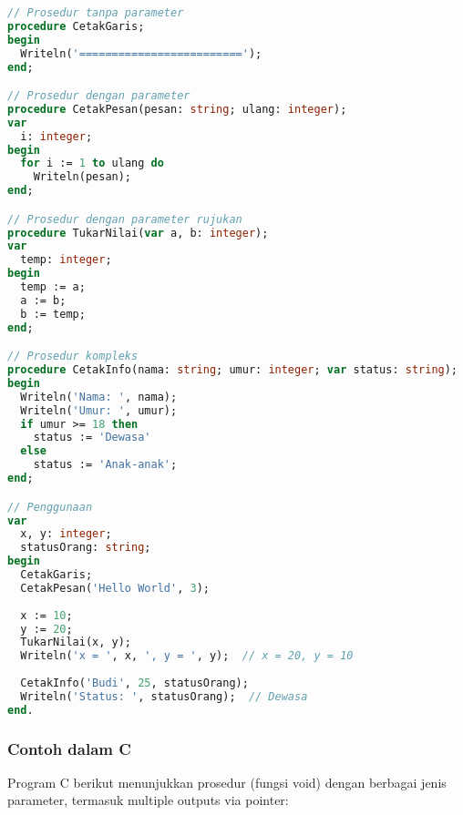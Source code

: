 \documentclass[../main.tex]{subfiles}
\begin{document}
\begin{lstlisting}[language=Pascal, caption={Deklarasi dan definisi prosedur (Pascal)}]
// Prosedur tanpa parameter
procedure CetakGaris;
begin
  Writeln('=========================');
end;

// Prosedur dengan parameter
procedure CetakPesan(pesan: string; ulang: integer);
var
  i: integer;
begin
  for i := 1 to ulang do
    Writeln(pesan);
end;

// Prosedur dengan parameter rujukan
procedure TukarNilai(var a, b: integer);
var
  temp: integer;
begin
  temp := a;
  a := b;
  b := temp;
end;

// Prosedur kompleks
procedure CetakInfo(nama: string; umur: integer; var status: string);
begin
  Writeln('Nama: ', nama);
  Writeln('Umur: ', umur);
  if umur >= 18 then
    status := 'Dewasa'
  else
    status := 'Anak-anak';
end;

// Penggunaan
var
  x, y: integer;
  statusOrang: string;
begin
  CetakGaris;
  CetakPesan('Hello World', 3);
  
  x := 10;
  y := 20;
  TukarNilai(x, y);
  Writeln('x = ', x, ', y = ', y);  // x = 20, y = 10
  
  CetakInfo('Budi', 25, statusOrang);
  Writeln('Status: ', statusOrang);  // Dewasa
end.
\end{lstlisting}

\subsubsection{Contoh dalam C}

Program C berikut menunjukkan prosedur (fungsi void) dengan berbagai jenis parameter, termasuk multiple outputs via pointer:
\end{document}
